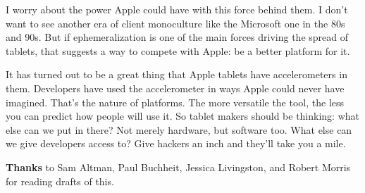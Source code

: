 I worry about the power Apple could have with this force behind them. I
don't want to see another era of client monoculture like the Microsoft
one in the 80s and 90s. But if ephemeralization is one of the main
forces driving the spread of tablets, that suggests a way to compete
with Apple: be a better platform for it.

It has turned out to be a great thing that Apple tablets have
accelerometers in them. Developers have used the accelerometer in ways
Apple could never have imagined. That's the nature of platforms. The
more versatile the tool, the less you can predict how people will use
it. So tablet makers should be thinking: what else can we put in there?
Not merely hardware, but software too. What else can we give developers
access to? Give hackers an inch and they'll take you a mile.

\textbf{Thanks} to Sam Altman, Paul Buchheit, Jessica Livingston, and
Robert Morris for reading drafts of this.
